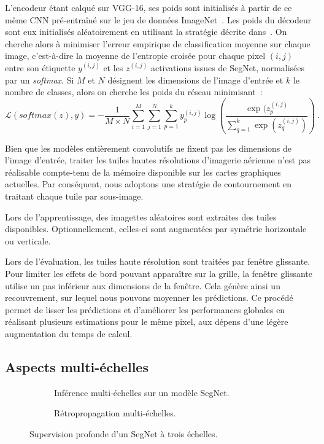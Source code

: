 L'encodeur étant calqué sur VGG-16, ses poids sont initialisés à partir de ce même CNN pré-entraîné sur le jeu de données ImageNet~\cite{deng_imagenet_2009}. Les poids du décodeur sont eux initialisés aléatoirement en utilisant la stratégie décrite dans~\cite{he_delving_2015}. On cherche alors à minimiser l'erreur empirique de classification moyenne sur chaque image, c'est-à-dire la moyenne de l'entropie croisée pour chaque pixel $(i,j)$ entre son étiquette $y^{(i,j)}$ et les $z^{(i,j)}$ activations issues de SegNet, normalisées par un \emph{softmax}. Si $M$ et $N$ désignent les dimensions de l'image d'entrée et $k$ le nombre de classes, alors on cherche les poids du réseau minimisant~:
\begin{equation}
\mathcal{L}(\mathit{softmax}(z),y) = - \frac{1}{M \times N} \sum_{i=1}^M \sum_{j=1}^N \sum_{p=1}^k y_p^{(i,j)} \log\left(\frac{\exp(z_p^{(i,j)}}{\sum\limits_{q=1}^k \exp(z_q^{(i,j)})}\right)~.
\end{equation}


Bien que les modèles entièrement convolutifs ne fixent pas les dimensions de l'image d'entrée, traiter les tuiles hautes résolutions d'imagerie aérienne n'est pas réalisable compte-tenu de la mémoire disponible sur les cartes graphiques actuelles. Par conséquent, nous adoptons une stratégie de contournement en traitant chaque tuile par sous-image.

Lors de l'apprentissage, des imagettes aléatoires sont extraites des tuiles disponibles. Optionnellement, celles-ci sont augmentées par symétrie horizontale ou verticale.

Lors de l'évaluation, les tuiles haute résolution sont traitées par fenêtre glissante. Pour limiter les effets de bord pouvant apparaître sur la grille, la fenêtre glissante utilise un pas inférieur aux dimensions de la fenêtre. Cela génère ainsi un recouvrement, sur lequel nous pouvons moyenner les prédictions. Ce procédé permet de lisser les prédictions et d'améliorer les performances globales en réalisant plusieurs estimations pour le même pixel, aux dépens d'une légère augmentation du temps de calcul.

\subsection{Aspects multi-échelles}

\begin{figure}
	  \begin{subfigure}[t]{0.50\textwidth}
		\resizebox{\textwidth}{!}{}
        \caption{Inférence multi-échelles sur un modèle SegNet.}
    \end{subfigure}
    \begin{subfigure}[t]{0.50\textwidth}
		\resizebox{\textwidth}{!}{}
        \caption{Rétropropagation multi-échelles.}
    \end{subfigure}
    \caption{Supervision profonde d'un SegNet à trois échelles.}
    \label{fig:ms_deep_segnet}
\end{figure}

